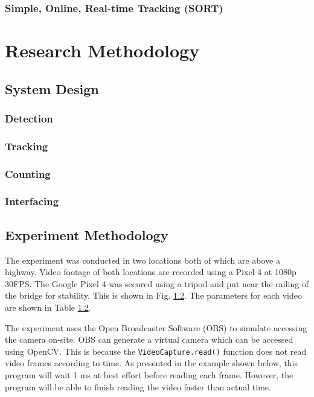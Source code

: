 \documentclass[12pt,a4paper,fleqn]{report}
\begin{document}
\subsection{Simple, Online, Real-time Tracking (SORT)}

\chapter{Research Methodology}

\section{System Design}

\subsection{Detection}

\subsection{Tracking}

\subsection{Counting}

\subsection{Interfacing}

\section{Experiment Methodology}
The experiment was conducted in two locations both of which are above a highway. 
Video footage of both locations are recorded using a Pixel 4 at 1080p 30FPS. 
The Google Pixel 4 was secured using a tripod and put near the railing of the bridge for stability.
This is shown in Fig. \ref{}.
The parameters for each video are shown in Table \ref{}.

The experiment uses the Open Broadcaster Software (OBS) to simulate accessing the camera on-site. 
OBS can generate a virtual camera which can be accessed using OpenCV.
This is because the \texttt{VideoCapture.read()} function does not read video frames according to time.
As presented in the example shown below, this program will wait 1 ms at best effort before reading
each frame.
However, the program will be able to finish reading the video faster than actual time.
\end{document}
